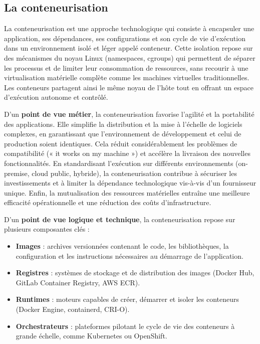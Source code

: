 \subsection{La conteneurisation}

La conteneurisation est une approche technologique qui consiste à encapsuler une application, ses dépendances, ses configurations et son cycle de vie d’exécution dans un environnement isolé et léger appelé conteneur. Cette isolation repose sur des mécanismes du noyau Linux (namespaces, cgroups) qui permettent de séparer les processus et de limiter leur consommation de ressources, sans recourir à une virtualisation matérielle complète comme les machines virtuelles traditionnelles. Les conteneurs partagent ainsi le même noyau de l’hôte tout en offrant un espace d’exécution autonome et contrôlé.

D’un \textbf{point de vue métier}, la conteneurisation favorise l’agilité et la portabilité des applications. Elle simplifie la distribution et la mise à l’échelle de logiciels complexes, en garantissant que l’environnement de développement et celui de production soient identiques. Cela réduit considérablement les problèmes de compatibilité (« it works on my machine ») et accélère la livraison des nouvelles fonctionnalités. En standardisant l’exécution sur différents environnements (on-premise, cloud public, hybride), la conteneurisation contribue à sécuriser les investissements et à limiter la dépendance technologique vis-à-vis d’un fournisseur unique. Enfin, la mutualisation des ressources matérielles entraîne une meilleure efficacité opérationnelle et une réduction des coûts d’infrastructure.

D’un \textbf{point de vue logique et technique}, la conteneurisation repose sur plusieurs composantes clés :
\begin{itemize}
	\item \textbf{Images} : archives versionnées contenant le code, les bibliothèques, la configuration et les instructions nécessaires au démarrage de l’application.
	\item \textbf{Registres} : systèmes de stockage et de distribution des images (Docker Hub, GitLab Container Registry, AWS ECR).
	\item \textbf{Runtimes} : moteurs capables de créer, démarrer et isoler les conteneurs (Docker Engine, containerd, CRI-O).
	\item \textbf{Orchestrateurs} : plateformes pilotant le cycle de vie des conteneurs à grande échelle, comme Kubernetes ou OpenShift.
\end{itemize}

